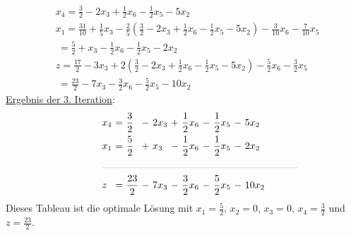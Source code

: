 \documentclass [a4paper,11pt]{article}
\begin{document}
\begin{enumerate}
\begin{align*}
            & x_4 = \frac{3}{2} - 2x_3 + \frac{1}{2}x_6 - \frac{1}{2}x_5 - 5x_2\\
            & x_1 = \frac{31}{10} + \frac{1}{5}x_3 - \frac{2}{5} \left( \frac{3}{2} - 2x_3 + \frac{1}{2}x_6 - \frac{1}{2}x_5 - 5x_2 \right) - \frac{3}{10}x_6 - \frac{7}{10}x_5\\
            &   \ = \frac{5}{2} + x_3 - \frac{1}{2}x_6 - \frac{1}{2}x_5 - 2x_2\\
            &   z = \frac{17}{2} - 3x_3 + 2\left( \frac{3}{2} - 2x_3 + \frac{1}{2}x_6 - \frac{1}{2}x_5 - 5x_2 \right) - \frac{5}{2}x_6 - \frac{3}{2}x_5\\
            &   \ = \frac{23}{2} - 7x_3 - \frac{3}{2}x_6 - \frac{5}{2}x_5 - 10x_2
            \end{align*}
            \underline{Ergebnis der 3. Iteration}:
            \begin{align*}
            \begin{alignedat}{6}
            & x_4 &\ = &\  \frac{3}{2} &\ - &\ 2x_3 &\ + &\ \frac{1}{2}x_6 &\ - &\ \frac{1}{2}x_5 &\ - &\ 5x_2 \\
            & x_1 &\ = &\  \frac{5}{2} &\ + &\  x_3 &\ - &\ \frac{1}{2}x_6 &\ - &\ \frac{1}{2}x_5 &\ - &\ 2x_2 \\
            &\rlap{\rule{7cm}{.1pt}} &&&&&&&&&&\\
            & z   &\ = &\ \frac{23}{2} &\ - &\ 7x_3 &\ - &\ \frac{3}{2}x_6 &\ - &\  \frac{5}{2}x_5 &\ - &\ 10x_2
            \end{alignedat}
            \end{align*}
            Dieses Tableau ist die optimale Lösung mit $x_1 = \frac{5}{2}$, $x_2 = 0$, $x_3 = 0$, $x_4 = \frac{3}{2}$ und $z = \frac{23}{2}$.
    \end{enumerate}
\end{document}
